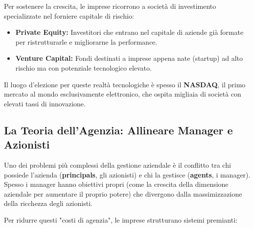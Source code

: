 \documentclass[a4paper,10pt]{article}
\begin{document}
Per sostenere la crescita, le imprese ricorrono a società di investimento specializzate nel forniere capitale di rischio:
\begin{itemize}
    \item \textbf{Private Equity:} Investitori che entrano nel capitale di aziende già formate per ristrutturarle e migliorarne la performance.
    \item \textbf{Venture Capital:} Fondi destinati a imprese appena nate (startup) ad alto rischio ma con potenziale tecnologico elevato.
\end{itemize}

Il luogo d'elezione per queste realtà tecnologiche è spesso il \textbf{NASDAQ}, il primo mercato al mondo esclusivamente elettronico, che ospita migliaia di società con elevati tassi di innovazione.

\subsection*{La Teoria dell'Agenzia: Allineare Manager e Azionisti}

Uno dei problemi più complessi della gestione aziendale è il conflitto tra chi possiede l'azienda (\textbf{principals}, gli azionisti) e chi la gestisce (\textbf{agents}, i manager). Spesso i manager hanno obiettivi propri (come la crescita della dimensione aziendale per aumentare il proprio potere) che divergono dalla massimizzazione della ricchezza degli azionisti.

Per ridurre questi "costi di agenzia", le imprese strutturano sistemi premianti:
\begin{table}[H]
\setlength{\extrarowheight}{10pt}
\caption{Incentivi e monitoraggio nella Corporate Governance}
\end{table}
\end{document}
